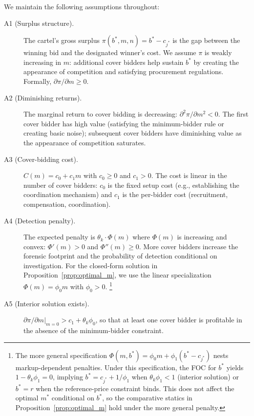 \noindent We maintain the following assumptions throughout: %

\begin{description}
  \item[A1 (Surplus structure).] The cartel's gross surplus
    $\pi(b^*, m, n) = b^* - c_{j^*}$ is the gap between the winning bid
    and the designated winner's cost. We assume $\pi$ is weakly
    increasing in $m$: additional cover bidders help sustain $b^*$ by
    creating the appearance of competition and satisfying procurement
    regulations. Formally, $\partial \pi / \partial m \geq 0$.

  \item[A2 (Diminishing returns).] The marginal return to cover bidding
    is decreasing: $\partial^2 \pi / \partial m^2 < 0$. The first cover
    bidder has high value (satisfying the minimum-bidder rule or creating
    basic noise); subsequent cover bidders have diminishing value as the
    appearance of competition saturates.

  \item[A3 (Cover-bidding cost).] $C(m) = c_0 + c_1 m$ with $c_0 \geq 0$
    and $c_1 > 0$. The cost is linear in the number of cover bidders:
    $c_0$ is the fixed setup cost (e.g., establishing the coordination
    mechanism) and $c_1$ is the per-bidder cost (recruitment,
    compensation, coordination).

  \item[A4 (Detection penalty).] The expected penalty is
    $\theta_k \cdot \Phi(m)$ where $\Phi(m)$ is increasing and convex:
    $\Phi'(m) > 0$ and $\Phi''(m) \geq 0$. More cover bidders increase
    the forensic footprint and the probability of detection conditional
    on investigation. For the closed-form solution in
    Proposition~\ref{prop:optimal_m}, we use the linear specialization
    $\Phi(m) = \phi_0 m$ with $\phi_0 > 0$.%
    \footnote{The more general specification $\Phi(m, b^*) =
    \phi_0 m + \phi_1 (b^* - c_{j^*})$ nests markup-dependent penalties.
    Under this specification, the FOC for $b^*$ yields
    $1 - \theta_k \phi_1 = 0$, implying $b^* = c_{j^*} + 1/\phi_1$
    when $\theta_k \phi_1 < 1$ (interior solution) or $b^* = r$ when
    the reference-price constraint binds. This does not affect the
    optimal $m^*$ conditional on $b^*$, so the comparative statics in
    Proposition~\ref{prop:optimal_m} hold under the more general
    penalty.}

  \item[A5 (Interior solution exists).] $\partial \pi / \partial m
    \big|_{m=0} > c_1 + \theta_k \phi_0$, so that at least one cover
    bidder is profitable in the absence of the minimum-bidder constraint.
\end{description}

